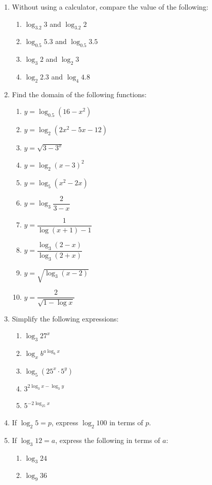 \documentclass[12pt]{report}
\begin{document}
\begin{multicols}{2}
\begin{enumerate}
    \item Without using a calculator, compare the value of the following:
          \begin{enumerate}
            \item $\log_{3.2}3$ and $\log_{3.2}2$
            \item $\log_{0.5}5.3$ and $\log_{0.5}3.5$
            \item $\log_{3}2$ and $\log_{2}3$
            \item $\log_{2}2.3$ and $\log_{4}4.8$
          \end{enumerate}

    \item Find the domain of the following functions:
          \begin{enumerate}
            \item $y=\log_{0.5}\left(16-x^{2}\right)$
            \item $y=\log_{2}\left(2x^{2}-5x-12\right)$
            \item $y=\sqrt{3-3^{x}}$
            \item $y=\log_{2}(x-3)^{2}$
            \item $y=\log_{5}\left(x^{2}-2x\right)$
            \item $y=\log_{3}{\dfrac{2}{3-x}}$
            \item $y=\dfrac{1}{\log(x+1)-1}$
            \item $y=\dfrac{\log_3\left(2-x\right)}{\log_3\left(2+x\right)}$
            \item $y=\sqrt{\log_{3}(x-2)}$
            \item $y={\dfrac{2}{\sqrt{1-\log x}}}$
          \end{enumerate}

    \item Simplify the following expressions:
          \begin{enumerate}
            \item $\log_{3}27^{x}$
            \item $\log_{x}b^{a\log_{b}x}$
            \item $\log_{5}\left(25^{x}\cdot5^{y}\right)$
            \item $3^{2\log_{3}x - \log_{3}y}$
            \item $5^{-2\log_{25}x}$
          \end{enumerate}

    \item If $\log_2 5 = p$, express $\log_2 100$ in terms of $p$.
    \item If $\log_3 12 = a$, express the following in terms of $a$:
          \begin{enumerate}
            \item $\log_3 24$
            \item $\log_9 36$
          \end{enumerate}


\end{enumerate}
\end{multicols}
\end{document}
